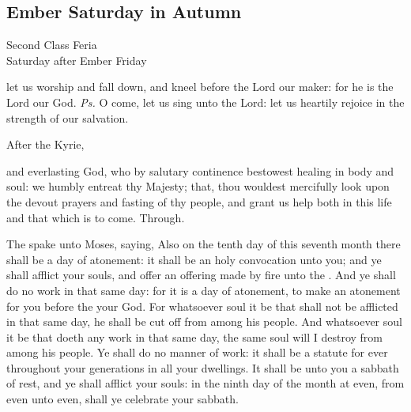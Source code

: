 \subsection{Ember Saturday in Autumn}
\begin{inhead}
    {Second Class Feria\\
Saturday after Ember Friday}
\end{inhead}
\par\noindent
\introit
{} let us worship and fall down, and kneel before the Lord our maker: for he is the Lord our God. \textit{Ps.} O come, let us sing unto the Lord: let us heartily rejoice in the strength of our salvation.

\clearpage
\begin{rubric}
    After the Kyrie,
\end{rubric}
\collect
{} and everlasting God, who by salutary continence bestowest healing in body and soul: we humbly entreat thy Majesty; that, thou wouldest mercifully look upon the devout prayers and fasting of thy people, and grant us help both in this life and that which is to come. Through.

 The  spake unto Moses, saying, Also on the tenth day of this seventh month there shall be a day of atonement: it shall be an holy convocation unto you; and ye shall afflict your souls, and offer an offering made by fire unto the . And ye shall do no work in that same day: for it is a day of atonement, to make an atonement for you before the  your God. For whatsoever soul it be that shall not be afflicted in that same day, he shall be cut off from among his people. And whatsoever soul it be that doeth any work in that same day, the same soul will I destroy from among his people. Ye shall do no manner of work: it shall be a statute for ever throughout your generations in all your dwellings. It shall be unto you a sabbath of rest, and ye shall afflict your souls: in the ninth day of the month at even, from even unto even, shall ye celebrate your sabbath.

